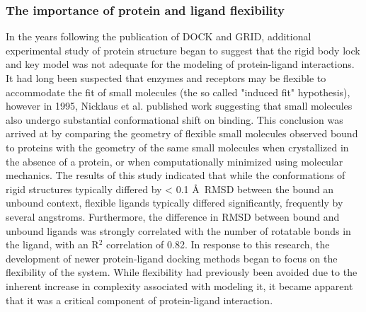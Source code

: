 \subsubsection{The importance of protein and ligand flexibility}
In the years following the publication of DOCK and GRID, additional experimental study of protein structure began to suggest that the rigid body lock and key model was not adequate for the modeling of protein-ligand interactions.
It had long been suspected\citep{KOSHLAND:1958wa} that enzymes and receptors may be flexible to accommodate the fit of small molecules (the so called "induced fit" hypothesis), however in 1995, Nicklaus et al.\citep{Nicklaus:1995tu} published work suggesting that small molecules also undergo substantial conformational shift on binding.
This conclusion was arrived at by comparing the geometry of flexible small molecules observed bound to proteins with the geometry of the same small molecules when crystallized in the absence of a protein, or when computationally minimized using molecular mechanics.
The results of this study indicated that while the conformations of rigid structures typically differed by < 0.1 \AA\ RMSD between the bound an unbound context, flexible ligands typically differed significantly, frequently by several angstroms.
Furthermore, the difference in RMSD between bound and unbound ligands was strongly correlated with the number of rotatable bonds in the ligand, with an R$^{2}$ correlation of 0.82.
In response to this research, the development of newer protein-ligand docking methods began to focus on the flexibility of the system.
While flexibility had previously been avoided due to the inherent increase in complexity associated with modeling it, it became apparent that it was a critical component of protein-ligand interaction.

